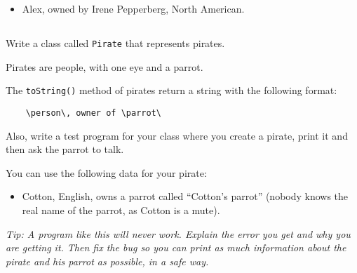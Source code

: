 \documentclass[a4paper, 11pt]{article}
\begin{document}
\begin{itemize}

  \item Alex, owned by Irene Pepperberg, North American.

\end{itemize}










\subsection{}

Write a class called \verb+Pirate+ that represents pirates.

Pirates are people, with one eye and a parrot.

The \verb+toString()+ method of pirates return a string with the following
format:

\verb+    \person\, owner of \parrot\+

Also, write a test program for your class where you create a pirate, print it
and then ask the parrot to talk.

You can use the following data for your pirate:

\begin{itemize}

  \item Cotton, English, owns a parrot called ``Cotton's parrot'' (nobody knows
    the real name of the parrot, as Cotton is a mute).

\end{itemize}

\textsl{Tip: A program like this will never work. Explain the error you get and
why you are getting it.  Then fix the bug so you can print as much information
about the pirate and his parrot as possible, in a safe way.}

\end{document}
